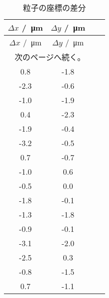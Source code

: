 \begin{longtable}{cccc}
    \caption{粒子の座標の差分} \label{tab:position-diff}                             \\
    \hline $\Delta x$ /\SI{}{\micro\meter} & $\Delta y$ /\SI{}{\micro\meter} \\ \hline
    \endfirsthead
    \hline $\Delta x$ /\SI{}{\micro\meter} & $\Delta y$ /\SI{}{\micro\meter} \\ \hline
    \endhead
    \hline \multicolumn{2}{r}{次のページへ続く。}                                     \\ \hline
    \endfoot
    \hline \endlastfoot

    0.8                                    & -1.8                            \\
    -2.3                                   & -0.6                            \\
    -1.0                                   & -1.9                            \\
    0.4                                    & -2.3                            \\
    -1.9                                   & -0.4                            \\
    -3.2                                   & -0.5                            \\
    0.7                                    & -0.7                            \\
    -1.0                                   & 0.6                             \\
    -0.5                                   & 0.0                             \\
    -1.8                                   & -0.1                            \\
    -1.3                                   & -1.8                            \\
    -0.9                                   & -0.1                            \\
    -3.1                                   & -2.0                            \\
    -2.5                                   & 0.3                             \\
    -0.8                                   & -1.5                            \\
    0.7                                    & -1.1                            \\

\end{longtable}
